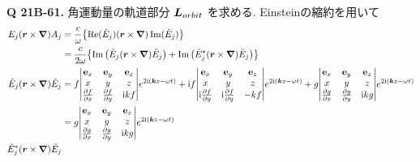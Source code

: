 \documentclass[a4paper,dvipdfmx]{jsarticle}
\theoremstyle{definition}
\begin{document}
\textbf{Q 21B-61.}
角運動量の軌道部分 $\vb*{L}_{orbit}$ を求める. Einsteinの縮約を用いて
\begin{align}
  E_j(\rr\times\vnabla)A_j
                    & = \frac{c}{\omega}\qty{\Re(\Et_j)(\rr\times\vnabla)\Im(\Et_j)}                                                                                                                                                                                                                                       \\
                    & = \frac{c}{2\omega}\qty{\Im\qty(\Et_j(\rr\times\vnabla)\Et_j) + \Im\qty(\Et_j^*(\rr\times\vnabla)\Et_j)}                                                                                                                                                                                             \\
  \Et_j(\rr\times\vnabla)\Et_j
                    & = f\mqty|\vb{e}_x                                                                                                                                                                                                                                                              & \vb{e}_y & \vb{e}_z \\ x & y & z \\ \pdv{f}{x} & \pdv{f}{y} & \ii kf | e^{2\ii(\kk z-\omega t)} + \ii f\mqty|\vb{e}_x                                                                                        & \vb{e}_y & \vb{e}_z \\ x & y & z \\ \ii\pdv{f}{y} & \ii\pdv{f}{y} & -kf | e^{2\ii(\kk z-\omega t)} + g\mqty|\vb{e}_x                                                                                        & \vb{e}_y & \vb{e}_z \\ x & y & z \\ \pdv{g}{x} & \pdv{g}{y} & \ii kg | e^{2\ii(\kk z-\omega t)} \\
                    & = g\mqty|\vb{e}_x                                                                                                                                                                                                                                                              & \vb{e}_y & \vb{e}_z \\ x & y & z \\ \pdv{g}{x} & \pdv{g}{y} & \ii kg | e^{2\ii(\kk z-\omega t)} \\
  \Et_j^*(\rr\times\vnabla)\Et_j

\end{align}
\end{document}
